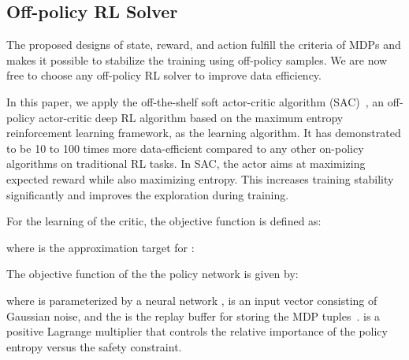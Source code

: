 \documentclass[runningheads]{llncs}
\begin{document}
\subsection{Off-policy RL Solver}
The proposed designs of state, reward, and action fulfill the criteria of MDPs and makes it possible to stabilize the training using off-policy samples. We are now free to choose any off-policy RL solver to improve data efficiency.

In this paper, we apply the off-the-shelf soft actor-critic algorithm (SAC)~\cite{haarnoja2018soft}, an off-policy actor-critic deep RL algorithm based on the maximum entropy reinforcement learning framework, as the learning algorithm. It has demonstrated to be 10 to 100 times more data-efficient compared to any other on-policy algorithms on traditional RL tasks. In SAC, the actor aims at maximizing expected reward while also maximizing entropy. This increases training stability significantly and improves the exploration during training. 

For the learning of the critic, the objective function is defined as:

where  is the approximation target for  :


The objective function of the the policy network is given by:

where  is parameterized by a neural network ,  is an input vector consisting of Gaussian noise, and the  is the replay buffer  for storing the MDP tuples~\cite{mnih2015human}.  is a positive Lagrange multiplier that controls the relative importance of the policy entropy versus the safety constraint. 
\end{document}
